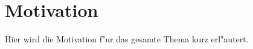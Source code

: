 \section{Motivation}
\label{sec:motivation}
Hier wird die Motivation f"ur das gesamte Thema kurz erl"autert. %
